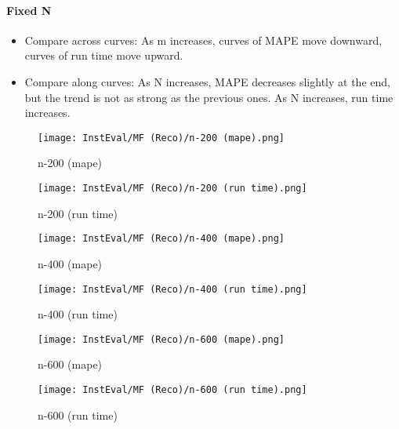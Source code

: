 \documentclass[12pt]{article}
\begin{document}
\paragraph{Fixed N}
\begin{itemize}
\item Compare across curves: As m increases, curves of MAPE move downward, curves of run time move upward.
\item Compare along curves: As N increases, MAPE decreases slightly at the end, but the trend is not as strong as the previous ones. As N increases, run time increases. 
\end{itemize}

\begin{figure}[H]
\centering
    \begin{minipage}{0.45\textwidth}
        \centering
        \texttt{[image: InstEval/MF (Reco)/n-200 (mape).png]}
        \caption{n-200 (mape)}
        \label{fig:figure1}
    \end{minipage}\hfill
    \begin{minipage}{0.45\textwidth}
        \centering
        \texttt{[image: InstEval/MF (Reco)/n-200 (run time).png]}
        \caption{n-200 (run time)}
    \end{minipage}
\end{figure}

\begin{figure}[H]
\centering
    \begin{minipage}{0.45\textwidth}
        \centering
        \texttt{[image: InstEval/MF (Reco)/n-400 (mape).png]}
        \caption{n-400 (mape)}
        \label{fig:figure1}
    \end{minipage}\hfill
    \begin{minipage}{0.45\textwidth}
        \centering
        \texttt{[image: InstEval/MF (Reco)/n-400 (run time).png]}
        \caption{n-400 (run time)}
    \end{minipage}
\end{figure}

\begin{figure}[H]
\centering
    \begin{minipage}{0.45\textwidth}
        \centering
        \texttt{[image: InstEval/MF (Reco)/n-600 (mape).png]}
        \caption{n-600 (mape)}
        \label{fig:figure1}
    \end{minipage}\hfill
    \begin{minipage}{0.45\textwidth}
        \centering
        \texttt{[image: InstEval/MF (Reco)/n-600 (run time).png]}
        \caption{n-600 (run time)}
    \end{minipage}
\end{figure}
\end{document}
